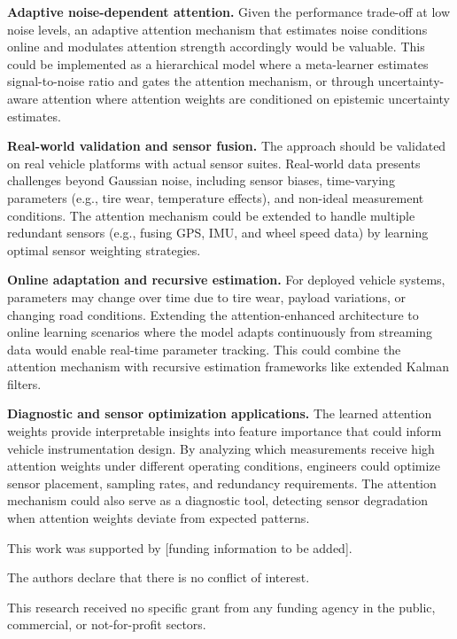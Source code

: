\documentclass[Afour,sageh,times]{sagej}
\begin{document}
\textbf{Adaptive noise-dependent attention.} Given the performance trade-off at low noise levels, an adaptive attention mechanism that estimates noise conditions online and modulates attention strength accordingly would be valuable. This could be implemented as a hierarchical model where a meta-learner estimates signal-to-noise ratio and gates the attention mechanism, or through uncertainty-aware attention where attention weights are conditioned on epistemic uncertainty estimates.

\textbf{Real-world validation and sensor fusion.} The approach should be validated on real vehicle platforms with actual sensor suites. Real-world data presents challenges beyond Gaussian noise, including sensor biases, time-varying parameters (e.g., tire wear, temperature effects), and non-ideal measurement conditions. The attention mechanism could be extended to handle multiple redundant sensors (e.g., fusing GPS, IMU, and wheel speed data) by learning optimal sensor weighting strategies.

\textbf{Online adaptation and recursive estimation.} For deployed vehicle systems, parameters may change over time due to tire wear, payload variations, or changing road conditions. Extending the attention-enhanced architecture to online learning scenarios where the model adapts continuously from streaming data would enable real-time parameter tracking. This could combine the attention mechanism with recursive estimation frameworks like extended Kalman filters.

\textbf{Diagnostic and sensor optimization applications.} The learned attention weights provide interpretable insights into feature importance that could inform vehicle instrumentation design. By analyzing which measurements receive high attention weights under different operating conditions, engineers could optimize sensor placement, sampling rates, and redundancy requirements. The attention mechanism could also serve as a diagnostic tool, detecting sensor degradation when attention weights deviate from expected patterns.

\begin{acks}
This work was supported by [funding information to be added].
\end{acks}

\begin{dci}
The authors declare that there is no conflict of interest.
\end{dci}

\begin{funding}
This research received no specific grant from any funding agency in the public, commercial, or not-for-profit sectors.
\end{funding}



\end{document}

